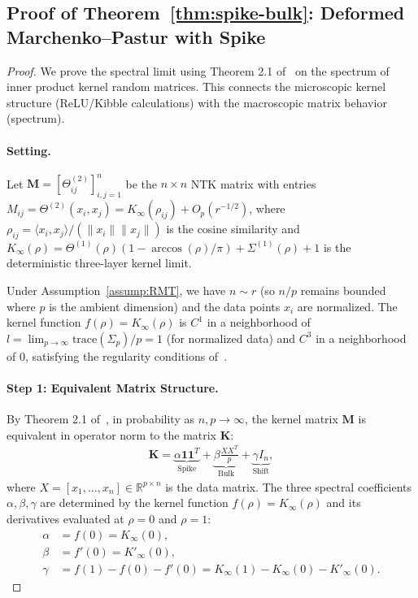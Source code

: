 \subsection{Proof of Theorem~\ref{thm:spike-bulk}: Deformed Marchenko–Pastur with Spike}
\label{appendix:marchenko-pastur}

\begin{proof}
\label{appendix:proof-spike-bulk}
We prove the spectral limit using Theorem 2.1 of~\cite{El_Karoui_2010} on the spectrum of inner product kernel random matrices. This connects the microscopic kernel structure (ReLU/Kibble calculations) with the macroscopic matrix behavior (spectrum).

\paragraph{Setting.}
Let \(\mathbf{M} = [\Theta^{(2)}_{ij}]_{i,j=1}^n\) be the \(n \times n\) NTK matrix with entries \(M_{ij} = \Theta^{(2)}(x_i, x_j) = K_\infty(\rho_{ij}) + O_p(r^{-1/2})\), where \(\rho_{ij} = \langle x_i, x_j \rangle / (\|x_i\|\|x_j\|)\) is the cosine similarity and \(K_\infty(\rho) = \Theta^{(1)}(\rho)(1 - \arccos(\rho)/\pi) + \Sigma^{(1)}(\rho) + 1\) is the deterministic three-layer kernel limit.

Under Assumption~\ref{assump:RMT}, we have \(n \sim r\) (so \(n/p\) remains bounded where \(p\) is the ambient dimension) and the data points \(x_i\) are normalized. The kernel function \(f(\rho) = K_\infty(\rho)\) is \(C^1\) in a neighborhood of \(l = \lim_{p\to\infty} \text{trace}(\Sigma_p)/p = 1\) (for normalized data) and \(C^3\) in a neighborhood of \(0\), satisfying the regularity conditions of~\cite{El_Karoui_2010}.

\paragraph{Step 1: Equivalent Matrix Structure.}
By Theorem 2.1 of~\cite{El_Karoui_2010}, in probability as \(n, p \to \infty\), the kernel matrix \(\mathbf{M}\) is equivalent in operator norm to the matrix \(\mathbf{K}\):
\begin{align}
\mathbf{K} = \underbrace{\alpha \mathbf{1}\mathbf{1}^T}_{\text{Spike}} + \underbrace{\beta \frac{XX^T}{p}}_{\text{Bulk}} + \underbrace{\gamma I_n}_{\text{Shift}},
\end{align}
where \(X = [x_1, \dots, x_n] \in \mathbb{R}^{p \times n}\) is the data matrix. The three spectral coefficients \(\alpha, \beta, \gamma\) are determined by the kernel function \(f(\rho) = K_\infty(\rho)\) and its derivatives evaluated at \(\rho = 0\) and \(\rho = 1\):
\begin{align}
\alpha &= f(0) = K_\infty(0), \label{eq:alpha} \\
\beta &= f'(0) = K'_\infty(0), \label{eq:beta} \\
\gamma &= f(1) - f(0) - f'(0) = K_\infty(1) - K_\infty(0) - K'_\infty(0). \label{eq:gamma}
\end{align}


\end{proof}
